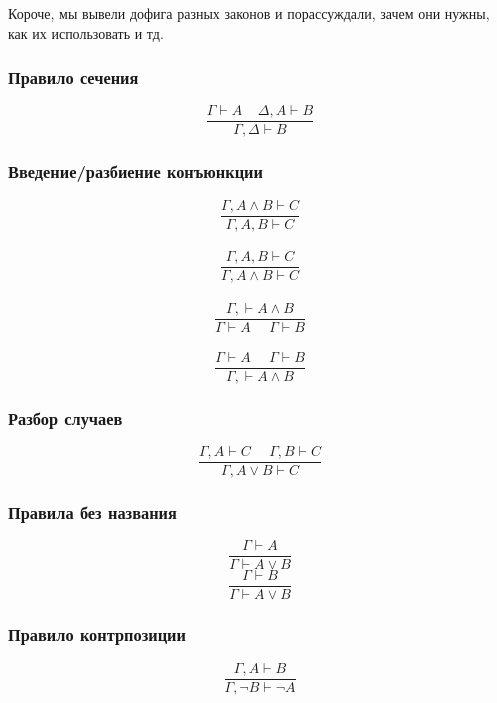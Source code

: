 Короче, мы вывели дофига разных законов и порассуждали, зачем они нужны, как их использовать и тд. 

\subsubsection{Правило сечения}
$$\frac{\Gamma\vdash  A\ \ \ \ \ \Delta, A \vdash B}{\Gamma, \Delta \vdash B}$$

\subsubsection{Введение/разбиение конъюнкции}
$$\frac{\Gamma, A\wedge B \vdash  C}{\Gamma, A, B \vdash C}$$
\\
$$\frac{\Gamma, A, B \vdash C}{\Gamma, A\wedge B \vdash  C}$$
\\
$$\frac{\Gamma, \vdash A \wedge B}{\Gamma\vdash  A\ \ \ \ \ \ \Gamma\vdash B}$$
\\
$$\frac{\Gamma\vdash  A\ \ \ \ \ \ \Gamma\vdash B}{\Gamma, \vdash A \wedge B}$$

\subsubsection{Разбор случаев}
$$\frac{\Gamma, A\vdash C\ \ \ \ \ \ \Gamma, B\vdash C}{\Gamma, A\vee B\vdash C}$$

\subsubsection{Правила без названия}
$$\frac{\Gamma \vdash A}{\Gamma\vdash A\vee B}$$
$$\frac{\Gamma \vdash B}{\Gamma\vdash A\vee B}$$

\subsubsection{Правило контрпозиции}
$$\frac{\Gamma, A \vdash B}{\Gamma, \neg B \vdash \neg A}$$